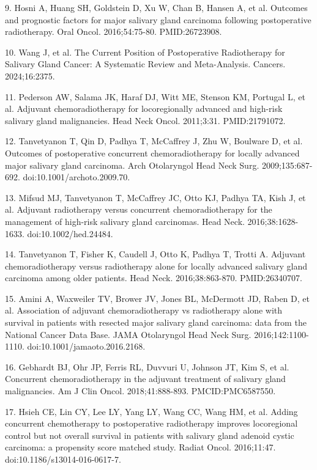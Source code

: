 \documentclass[9pt,twocolumn]{extarticle}
\begin{document}
9. Hosni A, Huang SH, Goldstein D, Xu W, Chan B, Hansen A, et al. Outcomes and prognostic factors for major salivary gland carcinoma following postoperative radiotherapy. Oral Oncol. 2016;54:75-80. PMID:26723908.\par
10. Wang J, et al. The Current Position of Postoperative Radiotherapy for Salivary Gland Cancer: A Systematic Review and Meta-Analysis. Cancers. 2024;16:2375.\par
11. Pederson AW, Salama JK, Haraf DJ, Witt ME, Stenson KM, Portugal L, et al. Adjuvant chemoradiotherapy for locoregionally advanced and high-risk salivary gland malignancies. Head Neck Oncol. 2011;3:31. PMID:21791072.\par
12. Tanvetyanon T, Qin D, Padhya T, McCaffrey J, Zhu W, Boulware D, et al. Outcomes of postoperative concurrent chemoradiotherapy for locally advanced major salivary gland carcinoma. Arch Otolaryngol Head Neck Surg. 2009;135:687-692. doi:10.1001/archoto.2009.70.\par
13. Mifsud MJ, Tanvetyanon T, McCaffrey JC, Otto KJ, Padhya TA, Kish J, et al. Adjuvant radiotherapy versus concurrent chemoradiotherapy for the management of high-risk salivary gland carcinomas. Head Neck. 2016;38:1628-1633. doi:10.1002/hed.24484.\par
14. Tanvetyanon T, Fisher K, Caudell J, Otto K, Padhya T, Trotti A. Adjuvant chemoradiotherapy versus radiotherapy alone for locally advanced salivary gland carcinoma among older patients. Head Neck. 2016;38:863-870. PMID:26340707.\par
15. Amini A, Waxweiler TV, Brower JV, Jones BL, McDermott JD, Raben D, et al. Association of adjuvant chemoradiotherapy vs radiotherapy alone with survival in patients with resected major salivary gland carcinoma: data from the National Cancer Data Base. JAMA Otolaryngol Head Neck Surg. 2016;142:1100-1110. doi:10.1001/jamaoto.2016.2168.\par
16. Gebhardt BJ, Ohr JP, Ferris RL, Duvvuri U, Johnson JT, Kim S, et al. Concurrent chemoradiotherapy in the adjuvant treatment of salivary gland malignancies. Am J Clin Oncol. 2018;41:888-893. PMCID:PMC6587550.\par
17. Hsieh CE, Lin CY, Lee LY, Yang LY, Wang CC, Wang HM, et al. Adding concurrent chemotherapy to postoperative radiotherapy improves locoregional control but not overall survival in patients with salivary gland adenoid cystic carcinoma: a propensity score matched study. Radiat Oncol. 2016;11:47. doi:10.1186/s13014-016-0617-7.\par
\end{document}
